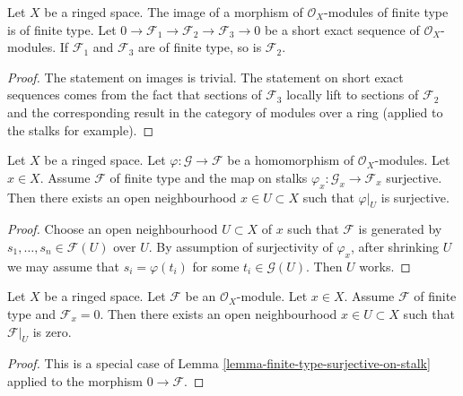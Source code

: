 \begin{lemma}
\label{lemma-extension-finite-type}
Let $X$ be a ringed space.
The image of a morphism of $\mathcal{O}_X$-modules of finite
type is of finite type.
Let
$0 \to \mathcal{F}_1 \to \mathcal{F}_2 \to \mathcal{F}_3 \to 0$
be a short exact sequence of $\mathcal{O}_X$-modules.
If $\mathcal{F}_1$ and $\mathcal{F}_3$ are of finite type,
so is $\mathcal{F}_2$.
\end{lemma}

\begin{proof}
The statement on images is trivial.
The statement on short exact sequences comes from the
fact that sections of $\mathcal{F}_3$ locally lift to sections
of $\mathcal{F}_2$ and the corresponding result in
the category of modules over a ring (applied to the stalks
for example).
\end{proof}

\begin{lemma}
\label{lemma-finite-type-surjective-on-stalk}
Let $X$ be a ringed space.
Let $\varphi : \mathcal{G} \to \mathcal{F}$ be a homomorphism
of $\mathcal{O}_X$-modules.
Let $x \in X$. Assume $\mathcal{F}$ of finite type and
the map on stalks
$\varphi_x : \mathcal{G}_x \to \mathcal{F}_x$ surjective.
Then there exists an open neighbourhood
$x \in U \subset X$ such that $\varphi|_U$ is surjective.
\end{lemma}

\begin{proof}
Choose an open neighbourhood $U \subset X$ of $x$ such that $\mathcal{F}$ is
generated by $s_1, \ldots, s_n \in \mathcal{F}(U)$ over $U$.
By assumption of surjectivity of $\varphi_x$,
after shrinking $U$ we may assume that $s_i = \varphi(t_i)$
for some $t_i \in \mathcal{G}(U)$.
Then $U$ works.
\end{proof}

\begin{lemma}
\label{lemma-finite-type-stalk-zero}
Let $X$ be a ringed space.
Let $\mathcal{F}$ be an $\mathcal{O}_X$-module.
Let $x \in X$.
Assume $\mathcal{F}$ of finite type and $\mathcal{F}_x = 0$.
Then there exists an open neighbourhood
$x \in U \subset X$ such that $\mathcal{F}|_U$ is zero.
\end{lemma}

\begin{proof}
This is a special case of
Lemma \ref{lemma-finite-type-surjective-on-stalk}
applied to the morphism $0 \to \mathcal{F}$.
\end{proof}

